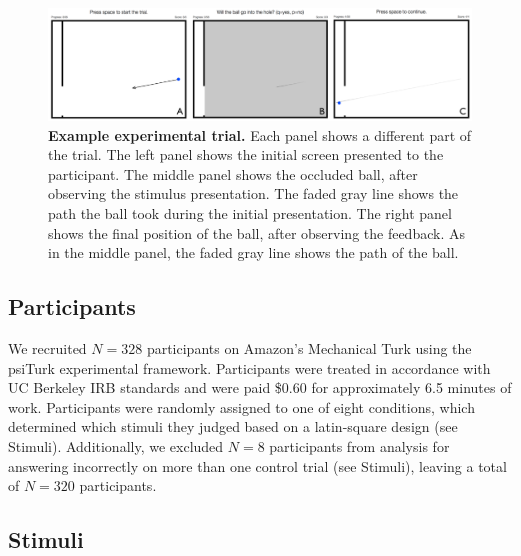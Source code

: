 \documentclass[10pt,letterpaper]{article}
\begin{document}
\begin{figure}[t]
    \begin{center}
        \includegraphics[width=\textwidth]{figures/experiment.png}
        \caption{\textbf{Example experimental trial.} Each panel shows a different part of the trial. The left panel shows the initial screen presented to the participant. The middle panel shows the occluded ball, after observing the stimulus presentation. The faded gray line shows the path the ball took during the initial presentation. The right panel shows the final position of the ball, after observing the feedback. As in the middle panel, the faded gray line shows the path of the ball.}
        \label{fig:experiment}
    \end{center}
\end{figure}

\subsection{Participants}

We recruited $N=328$ participants on Amazon's Mechanical Turk using the psiTurk \cite{McDonnell12} experimental framework. Participants were treated in accordance with UC Berkeley IRB standards and were paid \$0.60 for approximately 6.5 minutes of work. Participants were randomly assigned to one of eight conditions, which determined which stimuli they judged based on a latin-square design (see Stimuli). Additionally, we excluded $N=8$ participants from analysis for answering incorrectly on more than one control trial (see Stimuli), leaving a total of $N=320$ participants.

\subsection{Stimuli}
\end{document}
